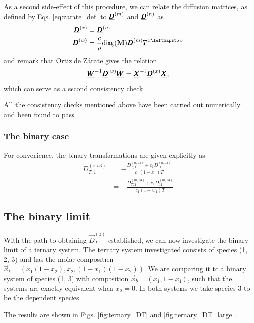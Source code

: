 As a second side-effect of this procedure, we can relate the diffusion matrices, as defined by Eqs. \eqref{eq:zarate_def} to $\underline{\pmb{D}}^{(m)}$ and $\underline{\pmb{D}}^{(n)}$ as
\begin{equation}
    \begin{split}
        \Mat{D}^{(x)} &= \Mat{D}^{(n)} \\
        \Mat{D}^{(w)} &= \frac{c}{\rho} \diag(\Vec{M}) \Mat{D}^{(m)} \Mat{T}^{x \leftmapsto w}
    \end{split}
\end{equation}
and remark that Ortiz de Zárate gives the relation
\begin{equation}
    \underline{\pmb{W}}^{-1} \underline{\pmb{D}}^{(w)} \underline{\pmb{W}} = \underline{\pmb{X}}^{-1} \underline{\pmb{D}}^{(x)} \underline{\pmb{X}},
\end{equation}
which can serve as a second consistency check.

All the consistency checks mentioned above have been carried out numerically and been found to pass.

\subsubsection{The binary case}

For convenience, the binary transformations are given explicitly as
\begin{equation}
    \begin{split}
        D_{T,1}^{(z,b3)} &= - \frac{D_{T,1}^{(n, b3)} + c_1 D_{11}^{(n, b3)}}{c_1 (1 - x_1) T} \\
        &= - \frac{D_{T,1}^{(m, b3)} + c_1 D_{11}^{(m, b3)}}{c_1 (1 - w_1) T}
    \end{split}
\end{equation}

\subsection{The binary limit}

With the path to obtaining $\Vec{D}_T^{(z)}$ established, we can now investigate the binary limit of a ternary system. The ternary system investigated consists of species (1, 2, 3) and has the molar composition $\Vec{x}_t = (x_1(1 - x_2), x_2, (1 - x_1)(1 - x_2))$. We are comparing it to a binary system of species (1, 3) with composition $\Vec{x}_b = (x_1, 1 - x_1)$, such that the systems are exactly equivalent when $x_2 = 0$. In both systems we take species 3 to be the dependent species.

The results are shown in Figs. \ref{fig:ternary_DT} and \ref{fig:ternary_DT_large}.


